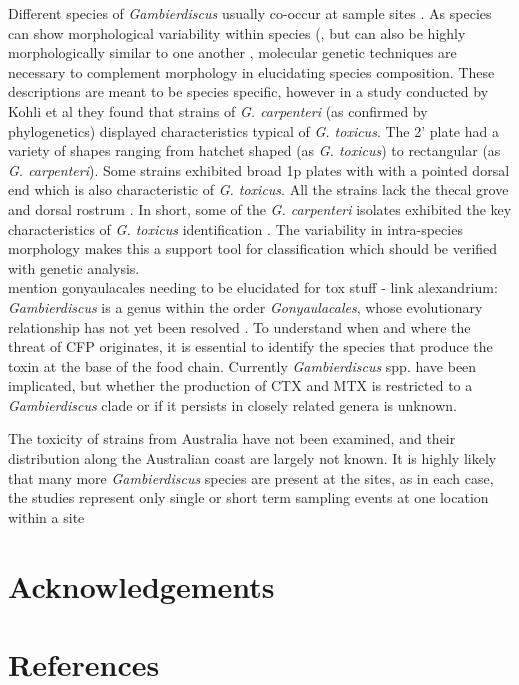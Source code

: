 \documentclass[12pt]{article}
\begin{document}
Different species of \emph{Gambierdiscus} usually co-occur at sample sites \cite{litaker2010global}. As species can show morphological variability within species (\cite{bravo2014cellular}, but can also be highly morphologically similar to one another \cite{kohli2014high}, molecular genetic techniques are necessary to complement morphology in elucidating species composition.
These descriptions are meant to be species specific, however in a study conducted by Kohli et al they found that strains of \emph{G. carpenteri} (as confirmed by phylogenetics) displayed characteristics typical of \emph{G. toxicus}. The 2' plate had a variety of shapes ranging from hatchet shaped (as \emph{G. toxicus}) to rectangular (as \emph{G. carpenteri}). Some strains exhibited broad 1p plates with with a pointed dorsal end which is also characteristic of \emph{G. toxicus}. All the strains lack the thecal grove and  dorsal rostrum \cite{litaker2009taxonomy}. In short, some of the \emph{G. carpenteri} isolates exhibited the key characteristics of \emph{G. toxicus} identification \cite{kohli2014high}.
The variability in intra-species morphology makes this a support tool for classification which should be verified with genetic analysis. \\

mention gonyaulacales needing to be elucidated for tox stuff - link alexandrium:
\emph{Gambierdiscus} is a genus within the order \emph{Gonyaulacales}, whose evolutionary relationship has not yet been resolved \cite{gentekaki2014large}. To understand when and where the threat of CFP originates, it is essential to identify the species that produce the toxin at the base of the food chain. Currently \emph{Gambierdiscus} spp. have been implicated, but whether the production of CTX and MTX is restricted to a \emph{Gambierdiscus} clade or if it  persists in closely related genera is unknown.

 The toxicity of strains from Australia have not been examined, and their distribution along the Australian coast are largely not known. It is highly likely that many more \emph{Gambierdiscus} species are present at the sites, as in each case, the studies represent only single or short term sampling events at one location within a site



\section{Acknowledgements}

\section{References}

\newpage


\end{document}
